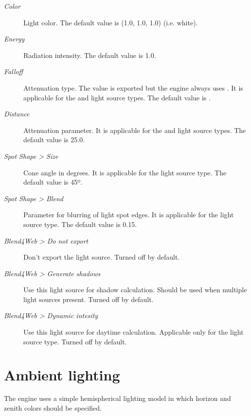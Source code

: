 \documentclass[a4paper,12pt,oneside]{sphinxmanual}
\begin{document}
\begin{DUlineblock}{0em}
\item[] 
\end{DUlineblock}
\begin{description}
\item[{\emph{Color}}] \leavevmode
Light color. The default value is (1.0, 1.0, 1.0) (i.e. white).

\item[{\emph{Energy}}] \leavevmode
Radiation intensity. The default value is 1.0.

\item[{\emph{Falloff}}] \leavevmode
Attenuation type. The value is exported but the engine always uses . It is applicable for the  and  light source types. The default value is .

\item[{\emph{Distance}}] \leavevmode
Attenuation parameter. It is applicable for the  and  light source types. The default value is 25.0.

\item[{\emph{Spot Shape \textgreater{} Size}}] \leavevmode
Cone angle in degrees. It is applicable for the  light source type. The default value is 45º.

\item[{\emph{Spot Shape \textgreater{} Blend}}] \leavevmode
Parameter for blurring of light spot edges. It is applicable for the  light source type. The default value is 0.15.

\item[{\emph{Blend4Web \textgreater{} Do not export}}] \leavevmode
Don't export the light source. Turned off by default.

\item[{\emph{Blend4Web \textgreater{} Generate shadows}}] \leavevmode
Use this light source for shadow calculation. Should be used when multiple light sources present. Turned off by default.

\item[{\emph{Blend4Web \textgreater{} Dynamic intesity}}] \leavevmode
Use this light source for daytime calculation. Applicable only for the  light source type. Turned off by default.

\end{description}


\section{Ambient lighting}
\label{lighting:id5}
The engine uses a simple hemispherical lighting model in which horizon and zenith colors should be specified.
\end{document}
